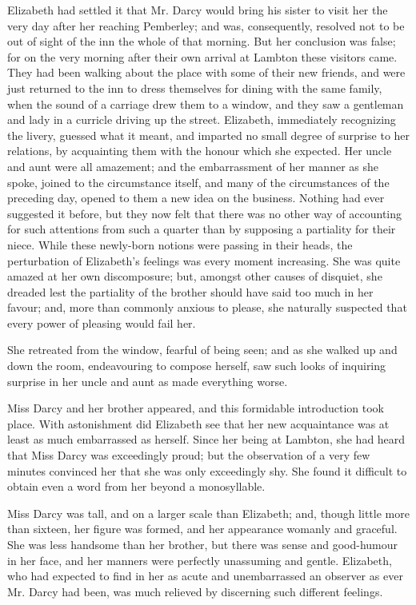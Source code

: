 \documentclass[12pt]{book}
\begin{document}
Elizabeth had settled it that Mr. Darcy would bring his sister to visit her the very day after her reaching Pemberley; and was, consequently, resolved not to be out of sight of the inn the whole of that morning. But her conclusion was false; for on the very morning after their own arrival at Lambton these visitors came. They had been walking about the place with some of their new friends, and were just returned to the inn to dress themselves for dining with the same family, when the sound of a carriage drew them to a window, and they saw a gentleman and lady in a curricle driving up the street. Elizabeth, immediately recognizing the livery, guessed what it meant, and imparted no small degree of surprise to her relations, by acquainting them with the honour which she expected. Her uncle and aunt were all amazement; and the embarrassment of her manner as she spoke, joined to the circumstance itself, and many of the circumstances of the preceding day, opened to them a new idea on the business. Nothing had ever suggested it before, but they now felt that there was no other way of accounting for such attentions from such a quarter than by supposing a partiality for their niece. While these newly-born notions were passing in their heads, the perturbation of Elizabeth's feelings was every moment increasing. She was quite amazed at her own discomposure; but, amongst other causes of disquiet, she dreaded lest the partiality of the brother should have said too much in her favour; and, more than commonly anxious to please, she naturally suspected that every power of pleasing would fail her.

She retreated from the window, fearful of being seen; and as she walked up and down the room, endeavouring to compose herself, saw such looks of inquiring surprise in her uncle and aunt as made everything worse.

Miss Darcy and her brother appeared, and this formidable introduction took place. With astonishment did Elizabeth see that her new acquaintance was at least as much embarrassed as herself. Since her being at Lambton, she had heard that Miss Darcy was exceedingly proud; but the observation of a very few minutes convinced her that she was only exceedingly shy. She found it difficult to obtain even a word from her beyond a monosyllable.

Miss Darcy was tall, and on a larger scale than Elizabeth; and, though little more than sixteen, her figure was formed, and her appearance womanly and graceful. She was less handsome than her brother, but there was sense and good-humour in her face, and her manners were perfectly unassuming and gentle. Elizabeth, who had expected to find in her as acute and unembarrassed an observer as ever Mr. Darcy had been, was much relieved by discerning such different feelings.
\end{document}
